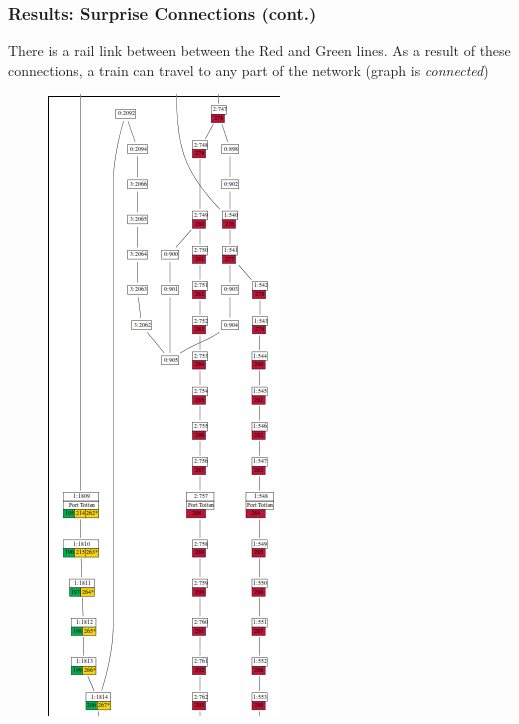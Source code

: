 \documentclass[t]{beamer}
\begin{document}
\begin{frame}
\frametitle{Results: Surprise Connections (cont.)}

There is a rail link between between the Red and Green lines.  As a result of these connections, a train can travel to any part of the network (graph is \textit{connected})
\begin{center}
\begin{figure}
  \includegraphics[scale=0.45]{red_to_green.png}
\end{figure}
\end{center}

\end{frame}
\end{document}
